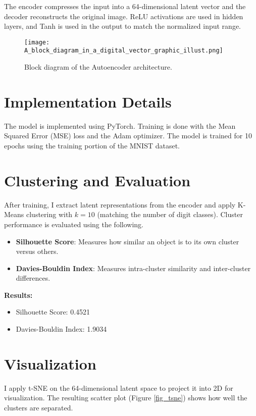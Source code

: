 \documentclass[conference]{IEEEtran}
\begin{document}
The encoder compresses the input into a 64-dimensional latent vector and the decoder reconstructs the original image. ReLU activations are used in hidden layers, and Tanh is used in the output to match the normalized input range.

\begin{figure}[htbp]
\centerline{\texttt{[image: A\_block\_diagram\_in\_a\_digital\_vector\_graphic\_illust.png]}}
\caption{Block diagram of the Autoencoder architecture.}
\label{fig:autoencoder}
\end{figure}



\section{Implementation Details}
The model is implemented using PyTorch. Training is done with the Mean Squared Error (MSE) loss and the Adam optimizer. The model is trained for 10 epochs using the training portion of the MNIST dataset.

\section{Clustering and Evaluation}
After training, I extract latent representations from the encoder and apply K-Means clustering with $k=10$ (matching the number of digit classes). Cluster performance is evaluated using the following.

\begin{itemize}
    \item \textbf{Silhouette Score}: Measures how similar an object is to its own cluster versus others.
    \item \textbf{Davies-Bouldin Index}: Measures intra-cluster similarity and inter-cluster differences.
\end{itemize}

\textbf{Results:}
\begin{itemize}
    \item Silhouette Score: 0.4521
    \item Davies-Bouldin Index: 1.9034
\end{itemize}

\section{Visualization}
I apply t-SNE on the 64-dimensional latent space to project it into 2D for visualization. The resulting scatter plot (Figure \ref{fig_tsne}) shows how well the clusters are separated.
\end{document}
